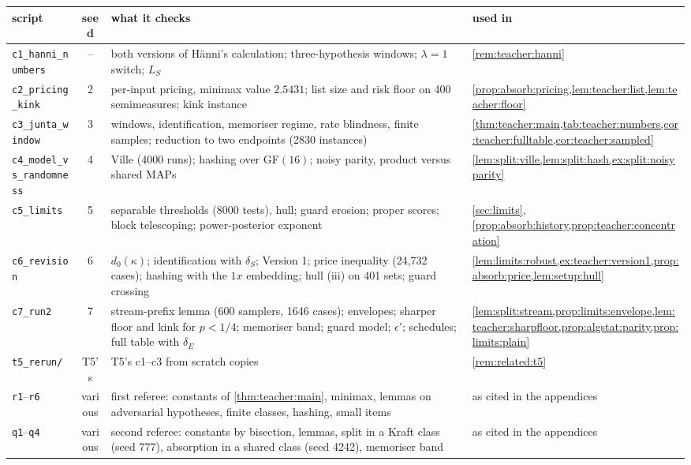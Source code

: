 \begin{center}\footnotesize\crefabbrev
\begin{tabularx}{\linewidth}{@{}l c >{\raggedright\arraybackslash}X >{\raggedright\arraybackslash}p{3.3cm}@{}}
\toprule
script & seed & what it checks & used in\\
\midrule
\texttt{c1\_hanni\_numbers} & -- & both versions of H\"anni's calculation; three-hypothesis windows; $\lambda=1$ switch; $L_S$ & \cref{rem:teacher:hanni}\\
\texttt{c2\_pricing\_kink} & 2 & per-input pricing, minimax value $2.5431$; list size and risk floor on 400 semimeasures; kink instance & \cref{prop:absorb:pricing,lem:teacher:list,lem:teacher:floor}\\
\texttt{c3\_junta\_window} & 3 & windows, identification, memoriser regime, rate blindness, finite samples; reduction to two endpoints (2830 instances) & \cref{thm:teacher:main,tab:teacher:numbers,cor:teacher:fulltable,cor:teacher:sampled}\\
\texttt{c4\_model\_vs\_randomness} & 4 & Ville (4000 runs); hashing over GF$(16)$; noisy parity, product versus shared MAPs & \cref{lem:split:ville,lem:split:hash,ex:split:noisyparity}\\
\texttt{c5\_limits} & 5 & separable thresholds (8000 tests), hull; guard erosion; proper scores; block telescoping; power-posterior exponent & \cref{sec:limits}, \cref{prop:absorb:history,prop:teacher:concentration}\\
\texttt{c6\_revision} & 6 & $d_0(\kappa)$; identification with $\delta_S$; Version 1; price inequality (24{,}732 cases); hashing with the $1x$ embedding; hull (iii) on 401 sets; guard crossing & \cref{lem:limits:robust,ex:teacher:version1,prop:absorb:price,lem:setup:hull}\\
\texttt{c7\_run2} & 7 & stream-prefix lemma (600 samplers, 1646 cases); envelopes; sharper floor and kink for $p<1/4$; memoriser band; guard model; $\epsilon'$; schedules; full table with $\delta_E$ & \cref{lem:split:stream,prop:limits:envelope,lem:teacher:sharpfloor,prop:algstat:parity,prop:limits:plain}\\
\texttt{t5\_rerun/} & T5's & T5's c1--c3 from scratch copies & \cref{rem:related:t5}\\
\texttt{r1}--\texttt{r6} & various & first referee: constants of \cref{thm:teacher:main}, minimax, lemmas on adversarial hypotheses, finite classes, hashing, small items & as cited in the appendices\\
\texttt{q1}--\texttt{q4} & various & second referee: constants by bisection, lemmas, split in a Kraft class (seed 777), absorption in a shared class (seed 4242), memoriser band & as cited in the appendices\\
\bottomrule
\end{tabularx}
\end{center}

